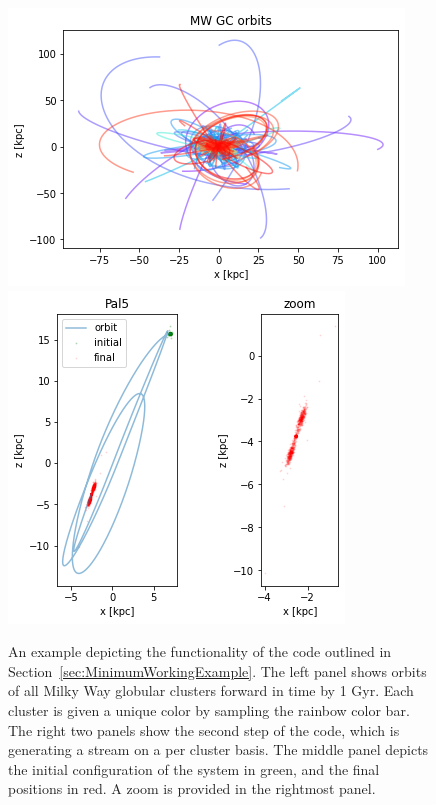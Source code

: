 \begin{figure}
    \centering
    \includegraphics[width=0.5\linewidth]{images/allorbits-example.png}
    \includegraphics[width=0.4\linewidth]{images/example-integration.png}
    \caption{An example depicting the functionality of the code outlined in Section~\ref{sec:MinimumWorkingExample}. The left panel shows orbits of all Milky Way globular clusters forward in time by 1 Gyr. Each cluster is given a unique color by sampling the rainbow color bar. The right two panels show the second step of the code, which is generating a stream on a per cluster basis. The middle panel depicts the initial configuration of the system in green, and the final positions in red. A zoom is provided in the rightmost panel.}
    \label{fig:all-orbits}
\end{figure}

